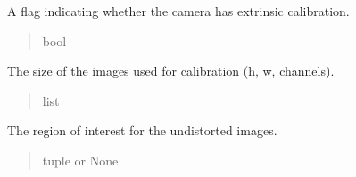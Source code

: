\documentclass[letterpaper,10pt,english]{sphinxmanual}
\begin{document}
\begin{fulllineitems}
\begin{fulllineitems}
\end{fulllineitems}


\begin{fulllineitems}
\label{\detokenize{CameraUtils:CameraUtils.Camera.EXT_CAL}}
\pysigstartsignatures
{}
\pysigstopsignatures
\sphinxAtStartPar
A flag indicating whether the camera has extrinsic calibration.
\begin{quote}\begin{description}
\sphinxAtStartPar
bool

\end{description}\end{quote}

\end{fulllineitems}


\begin{fulllineitems}
\label{\detokenize{CameraUtils:CameraUtils.Camera.img_size}}
\pysigstartsignatures
{}
\pysigstopsignatures
\sphinxAtStartPar
The size of the images used for calibration (h, w, channels).
\begin{quote}\begin{description}
\sphinxAtStartPar
list

\end{description}\end{quote}

\end{fulllineitems}


\begin{fulllineitems}
\label{\detokenize{CameraUtils:CameraUtils.Camera.roi}}
\pysigstartsignatures
{}
\pysigstopsignatures
\sphinxAtStartPar
The region of interest for the undistorted images.
\begin{quote}\begin{description}
\sphinxAtStartPar
tuple or None

\end{description}\end{quote}


\end{fulllineitems}
\end{fulllineitems}
\end{document}
